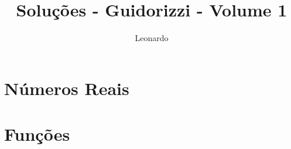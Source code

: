 \documentclass[10pt]{book}
\begin{document}
\author{Leonardo}
\title{Soluções - Guidorizzi - Volume 1}
\maketitle 
\chapter{Números Reais}




\chapter{Funções}

\end{document}
